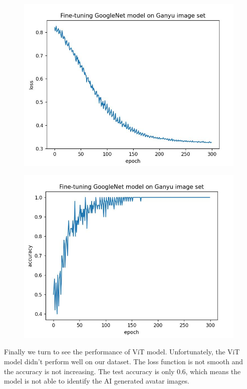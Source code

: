 \documentclass[conference]{IEEEtran}
\begin{document}
\begin{figure}[h]
  \centering
    \begin{minipage}{.24\textwidth}
      \centering
      \includegraphics[width=0.9\linewidth]{googlenet_ganyu_loss.jpg}
      \label{fig:test1}
    \end{minipage}%
    \begin{minipage}{.24\textwidth}
      \centering
      \includegraphics[width=0.9\linewidth]{googlenet_ganyu_accuracy.jpg}
      \label{fig:test2}
    \end{minipage}
\end{figure}

Finally we turn to see the performance of ViT model. Unfortunately, the ViT model didn't perform well on our dataset. The loss function is not smooth and the accuracy is not increasing. The test accuracy is only 0.6, which means the model is not able to identify the AI generated avatar images.
\end{document}
